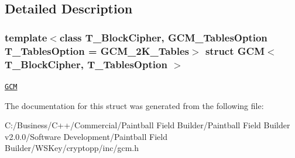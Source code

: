 \subsection{Detailed Description}
\subsubsection*{template$<$class T\_\-BlockCipher, GCM\_\-TablesOption T\_\-TablesOption = GCM\_\-2K\_\-Tables$>$ struct GCM$<$ T\_\-BlockCipher, T\_\-TablesOption $>$}

\href{http://www.cryptolounge.org/wiki/GCM}{\tt GCM} 

The documentation for this struct was generated from the following file:\begin{DoxyCompactItemize}
\item 
C:/Business/C++/Commercial/Paintball Field Builder/Paintball Field Builder v2.0.0/Software Development/Paintball Field Builder/WSKey/cryptopp/inc/gcm.h\end{DoxyCompactItemize}
